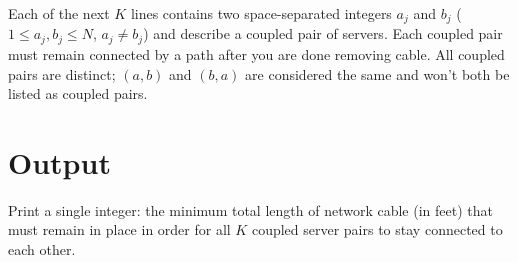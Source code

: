 Each of the next $K$ lines contains two space-separated integers $a_j$ and $b_j$ ($1 \le a_j, b_j \le N$, $a_j \ne b_j$) and describe a coupled pair of servers. Each coupled pair must remain connected by a path after you are done removing cable. All coupled pairs are distinct; $(a,b)$ and $(b,a)$ are considered the same and won't both be listed as coupled pairs.

\section*{Output}

Print a single integer: the minimum total length of network cable (in feet) that must remain in place in order for all $K$ coupled server pairs to stay connected to each other.